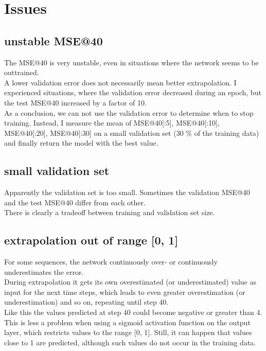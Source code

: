 \documentclass[a4paper,10pt]{article}
\begin{document}
\section{Issues}

\subsection{unstable MSE@40}

The MSE@40 is very unstable, even in situations where the network seems to be outtrained.\\
A lower validation error does not necessarily mean better extrapolation.
I experienced situations, where the validation error decreased during an epoch, but the test MSE@40 increased by a factor of 10.\\
As a conclusion, we can not use the validation error to determine when to stop training.
Instead, I measure the mean of MSE@40[:5], MSE@40[:10], MSE@40[:20], MSE@40[:30] on a small validation set (30 \% of the training data)
and finally return the model with the best value.

\subsection{small validation set}

Apparently the validation set is too small. Sometimes the validation MSE@40 and the test MSE@40 differ from each other.\\
There is clearly a tradeoff between training and validation set size.

\subsection{extrapolation out of range [0, 1]}

For some sequences, the network continuously over- or continuously underestimates the error.\\
During extrapolation it gets its own overestimated (or underestimated) value as input for the next time steps,
which leads to even greater overestimation (or underestimation) and so on, repeating until step 40.\\
Like this the values predicted at step 40 could become negative or greater than 4.\\
This is less a problem when using a sigmoid activation function on the output layer, which restricts values to the range [0, 1].
Still, it can happen that values close to 1 are predicted, although such values do not occur in the training data.
\end{document}
